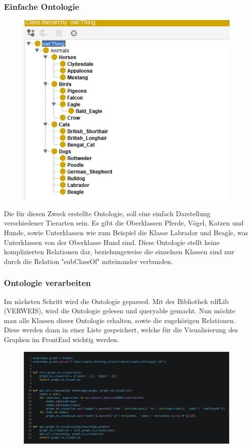 \subsubsection*{Einfache Ontologie}

\begin{figure}[!ht]
\includegraphics[scale=0.5]{Graphics/simple_ontology_owlviz.png}
\end{figure}

Die für diesen Zweck erstellte Ontologie, soll eine einfach Darstellung verschiedener Tierarten sein. 
Es gibt die Oberklassen Pferde, Vögel, Katzen und Hunde, sowie Unterklassen wie zum Beispiel die Klasse Labrador und Beagle, was Unterklassen von der Oberklasse Hund sind.
Diese Ontologie stellt keine komplizierten Relationen dar, beziehungsweise die einzelnen Klassen sind nur durch die Relation "subClassOf" miteinander verbunden.

\subsubsection*{Ontologie verarbeiten}
Im nächsten Schritt wird die Ontologie geparsed. Mit der Bibliothek rdfLib (VERWEIS), wird die Ontologie gelesen und queryable gemacht.
Nun möchte man alle Klassen dieser Ontologie erhalten, sowie die zugehörigen Relationen. Diese werden dann in einer Liste gespeichert, welche für die Visualisierung des Graphen im FrontEnd wichtig werden.

\begin{figure}[!ht]
    \includegraphics[scale=0.17]{Graphics/simple_ontology_graph_init.png}
    \end{figure}
    

